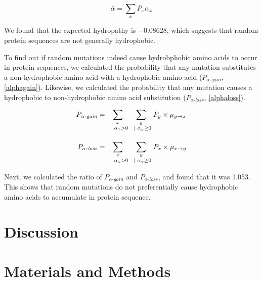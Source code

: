 \documentclass[12pt,a4paper]{article}
\begin{document}
\begin{equation}
\bar{\alpha} = \sum_{x} P_x \alpha_x
\label{expHydropathy}
\end{equation}


We found that the expected hydropathy is $-0.08628$, which suggests that random protein sequences are not generally hydrophobic. 
 
To find out if random mutations indeed cause hydrobphobic amino acids to occur in protein sequences, we calculated the probability that any mutation substitutes a non-hydrophobic amino acid with a hydrophobic amino acid ($P_{\alpha\textit{-gain}}$, \autoref{alphagain}). Likewise, we calculated the probability that any mutation causes a hydrophobic to non-hydrophobic amino acid substitution ($P_{\alpha\textit{-loss}}$, \autoref{alphaloss}).  

\begin{align}
P_{\alpha\textit{-gain}} & = \sum_{\genfrac{}{}{0pt}{1}{x}{\ |\ \alpha_x>0}} \sum_{\genfrac{}{}{0pt}{1}{y}{\ |\ \alpha_y \geq 0}} P_y \times \mu_{y\to x}\label{alphagain}\\[1em]
%
P_{\alpha\textit{-loss}} &= \sum_{\genfrac{}{}{0pt}{1}{x}{\ |\ \alpha_x>0}} \sum_{\genfrac{}{}{0pt}{1}{y}{\ |\ \alpha_y \geq 0}} P_x \times \mu_{x\to y}\label{alphaloss}
\end{align}

Next, we calculated the ratio of $P_{\alpha\textit{-gain}}$ and $P_{\alpha\textit{-loss}}$, and found that it was 1.053. This shows that random mutations do not preferentially cause hydrophobic amino acids to accumulate in protein sequence.

\section{Discussion} 



\section{Materials and Methods}



\end{document}
